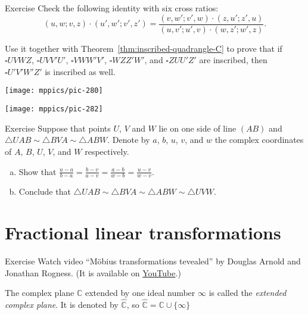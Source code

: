 \begin{thm}{Exercise}\label{ex:6-circles}
Check the following identity with six cross ratios:
\[(u,w;v,z)\cdot(u',w';v',z')=\frac{(v,w';v',w)\cdot(z,u';z',u)}{(u,v';u',v)\cdot(w,z';w',z)}.\]

Use it together with Theorem~\ref{thm:inscribed-quadrangle-C} to prove that if
$\square UVWZ$, $\square UVV'U'$, $\square VWW'V'$, $\square WZZ'W'$, and $\square ZUU'Z'$
are inscribed, then  $\square U'V'W'Z'$ is inscribed as well.

\end{thm}

\begin{minipage}{.48\textwidth}
\centering
\texttt{[image: mppics/pic-280]}
\end{minipage}
\hfill
\begin{minipage}{.48\textwidth}
\centering
\texttt{[image: mppics/pic-282]}
\end{minipage}

\medskip

\begin{thm}{Exercise}\label{ex:4-sim}
Suppose that points $U$, $V$ and $W$ lie on one side of line $(AB)$ and 
$\triangle UAB\sim \triangle BVA \sim \triangle ABW$.
Denote by $a$, $b$, $u$, $v$, and $w$ the complex coordinates of $A$, $B$, $U$, $V$, and $W$ respectively.
\begin{enumerate}[(a)]
 \item Show that $\tfrac{u-a}{b-a}=\tfrac{b-v}{a-v}=\tfrac{a-b}{w-b}=\tfrac{u-v}{w-v}$.
 \item Conclude that $\triangle UAB\sim \triangle BVA \sim \triangle ABW\sim \triangle UVW$.
\end{enumerate}
 
\end{thm}

\section*{Fractional linear transformations}

\begin{thm}{Exercise}\label{ex:movie}
Watch video ``M\"obius transformations tevealed'' by Douglas Arnold and Jonathan Rogness.
(It is available on \href{http://youtu.be/JX3VmDgiFnY}{YouTube}.)
\end{thm}


The complex plane $\mathbb{C}$ extended by one ideal number $\infty$ 
is called the \emph{extended complex plane}.
It is denoted by $\hat{\mathbb{C}}$, so $\hat{\mathbb{C}}=\mathbb{C}\cup\{\infty\}$

